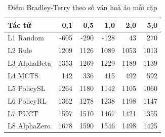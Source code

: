 \begin{table}[H]
  \centering
  \small
  \caption{Điểm Bradley-Terry theo số ván hoà ảo mỗi cặp}
  \label{tab:cs-tk-prior}
  \begin{tabular}{lrrrrr}
    \toprule
    Tác tử & 0,1 & 0,5 & 1,0 & 2,0 & 5,0 \\
    \midrule
    L1 Random & -605 & -290 & -128 & 43 & 270 \\
    L2 Rule & 1209 & 1126 & 1089 & 1053 & 1013 \\
    L3 AlphaBeta & 1353 & 1269 & 1229 & 1189 & 1139 \\
    L4 MCTS & 142 & 336 & 415 & 492 & 592 \\
    L5 PolicySL & 1264 & 1180 & 1142 & 1105 & 1060 \\
    L6 PolicyRL & 1362 & 1278 & 1238 & 1198 & 1147 \\
    L7 PUCT & 1597 & 1510 & 1467 & 1421 & 1355 \\
    L8 AlphaZero & 1678 & 1590 & 1546 & 1498 & 1425 \\
    \bottomrule
  \end{tabular}
\end{table}
